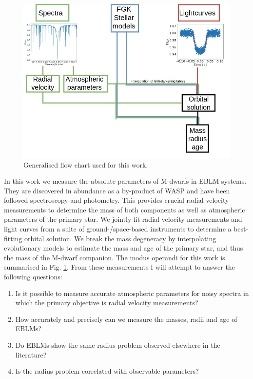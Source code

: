 \begin{figure}
    \includegraphics[width=\textwidth]{3-images/EBLM_flow-Page-1.png}
    \caption{Generalised flow chart used for this work.}
    \label{fig:EBLM_flow_chart}
\end{figure}

In this work we measure the absolute parameters of M-dwarfs in EBLM systems. They are discovered in abundance as a by-product of WASP and have been followed spectroscopy and photometry. This provides crucial radial velocity measurements to determine the mass of both components as well as atmospheric parameters of the primary star. We jointly fit radial velocity measurements and light curves from a suite of ground-/space-based instruments to determine a best-fitting orbital solution. We break the mass degeneracy by interpolating evolutionary models to estimate the mass and age of the primary star, and thus the mass of the M-dwarf companion. The modus operandi for this work is summarised in Fig. \ref{fig:EBLM_flow_chart}. From these measurements I will attempt to answer the following questions:

\begin{enumerate}
    \item Is it possible to measure accurate atmospheric parameters for noisy spectra in which the primary objective is radial velocity measurements?
    
    \item How accurately and precisely can we measure the masses, radii and age of EBLMs?
    
    \item Do EBLMs show the same radius problem observed elsewhere in the literature? 
    
    \item Is the radius problem correlated with observable parameters? 
\end{enumerate}

